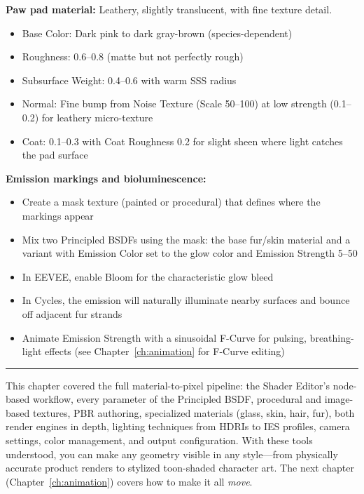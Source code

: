 \begin{furrybox}
\textbf{Paw pad material:} Leathery, slightly translucent, with
fine texture detail.
\begin{itemize}[leftmargin=1.5em]
  \item Base Color: Dark pink to dark gray-brown (species-dependent)
  \item Roughness: 0.6--0.8 (matte but not perfectly rough)
  \item Subsurface Weight: 0.4--0.6 with warm SSS radius
  \item Normal: Fine bump from Noise Texture (Scale 50--100) at low
        strength (0.1--0.2) for leathery micro-texture
  \item Coat: 0.1--0.3 with Coat Roughness 0.2 for slight sheen
        where light catches the pad surface
\end{itemize}
\end{furrybox}

\begin{furrybox}
\textbf{Emission markings and bioluminescence:}
\begin{itemize}[leftmargin=1.5em]
  \item Create a mask texture (painted or procedural) that defines
        where the markings appear
  \item Mix two Principled BSDFs using the mask: the base fur/skin
        material and a variant with Emission Color set to the glow
        color and Emission Strength 5--50
  \item In EEVEE, enable Bloom for the characteristic glow bleed
  \item In Cycles, the emission will naturally illuminate nearby
        surfaces and bounce off adjacent fur strands
  \item Animate Emission Strength with a sinusoidal F-Curve for
        pulsing, breathing-light effects
        (see Chapter~\ref{ch:animation} for F-Curve editing)
\end{itemize}
\end{furrybox}

\vspace{1em}
\begin{center}
\textcolor{bordergray}{\rule{0.6\textwidth}{0.4pt}}
\end{center}
\vspace{0.5em}

This chapter covered the full material-to-pixel pipeline: the Shader
Editor's node-based workflow, every parameter of the Principled BSDF,
procedural and image-based textures, PBR authoring, specialized
materials (glass, skin, hair, fur), both render engines in depth,
lighting techniques from HDRIs to IES profiles, camera settings,
color management, and output configuration. With these tools
understood, you can make any geometry visible in any style---from
physically accurate product renders to stylized toon-shaded
character art. The next chapter (Chapter~\ref{ch:animation}) covers
how to make it all \emph{move}.
